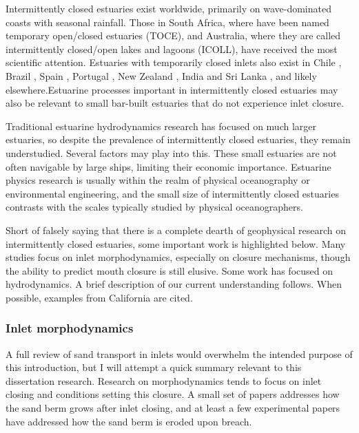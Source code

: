 Intermittently closed estuaries exist worldwide, primarily on wave-dominated coasts with seasonal rainfall. Those in South Africa, where have been named temporary open/closed estuaries (TOCE), and Australia, where they are called intermittently closed/open lakes and lagoons (ICOLL), have received the most scientific attention. Estuaries with temporarily closed inlets also exist in Chile \parencite{dussaillant_water_2009}, Brazil \parencite{suzuki_effects_1998}, Spain \parencite{moreno_morphodynamics_2010}, Portugal \parencite{fortunato_morphological_2014}, New Zealand \parencite{schallenberg_contrasting_2010}, India and Sri Lanka \parencite{ranasinghe_seasonal_2003}, and likely elsewhere.Estuarine processes important in intermittently closed estuaries may also be relevant to small bar-built estuaries that do not experience inlet closure. 

Traditional estuarine hydrodynamics research has focused on much larger estuaries, so despite the prevalence of intermittently closed estuaries, they remain understudied.  Several factors may play into this. These small estuaries are not often navigable by large ships, limiting their economic importance. Estuarine physics research is usually within the realm of physical oceanography or environmental engineering, and the small size of intermittently closed estuaries contrasts with the scales typically studied by physical oceanographers.

Short of falsely saying that there is a complete dearth of geophysical research on intermittently closed estuaries, some important work is highlighted below. Many studies focus on inlet morphodynamics, especially on closure mechanisms, though the ability to predict mouth closure is still elusive. Some work has focused on hydrodynamics. A brief description of our current understanding follows. When possible, examples from California are cited.

\subsubsection{Inlet morphodynamics}

A full review of sand transport in inlets would overwhelm the intended purpose of this introduction, but I will attempt a quick summary relevant to this dissertation research. Research on morphodynamics tends to focus on inlet closing and conditions setting this closure. A small set of papers addresses how the sand berm grows after inlet closing, and at least a few experimental papers have addressed how the sand berm is eroded upon breach.

